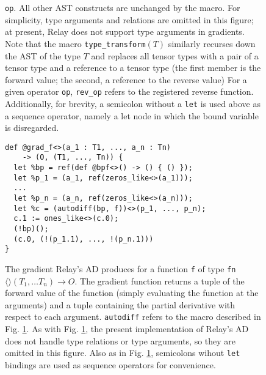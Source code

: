 \begin{figure}
{      \texttt{op}.
    All other AST constructs are unchanged by the macro.
    For simplicity, type arguments and relations
      are omitted in this figure;
      at present, Relay does not
      support type arguments in gradients.
    Note that the macro \texttt{type\_transform}$(T)$
      similarly recurses down the AST of the type $T$
      and replaces all tensor types with a
      pair of a tensor type
      and a reference to a tensor type
      (the first member is the forward value;
      the second, a reference to the reverse value)
    For a given operator \texttt{op},
      \texttt{rev\_op} refers to the registered reverse function.
    Additionally, for brevity,
      a semicolon without a \texttt{let}
      is used above as a sequence operator,
      namely a let node in which the bound
      variable is disregarded.}
  \label{fig:ad-expr-transform}
\end{figure}

\begin{figure}
  \begin{verbatim}
def @grad_f<>(a_1 : T1, ..., a_n : Tn)
    -> (O, (T1, ..., Tn)) {
  let %bp = ref(def @bpf<>() -> () { () });
  let %p_1 = (a_1, ref(zeros_like<>(a_1)));
  ...
  let %p_n = (a_n, ref(zeros_like<>(a_n)));
  let %c = (autodiff(bp, f))<>(p_1, ..., p_n);
  c.1 := ones_like<>(c.0);
  (!bp)();
  (c.0, (!(p_1.1), ..., !(p_n.1)))
}
  \end{verbatim}
  \caption{The gradient Relay{}'s AD produces
    for a function \texttt{f} of type
    \texttt{fn}$\langle\rangle(T_1, \ldots T_n) \rightarrow O$.
  The gradient function returns a tuple of
    the forward value of the function
    (simply evaluating the function at the arguments)
    and a tuple containing the
    partial derivative with respect to each argument.
  \texttt{autodiff} refers to the macro described in
    Fig. \ref{fig:ad-expr-transform}.
  As with Fig. \ref{fig:ad-expr-transform},
    the present implementation of
    Relay{}'s AD does not handle type relations or type arguments,
    so they are omitted in this figure.
  Also as in Fig. \ref{fig:ad-expr-transform},
    semicolons wihout \texttt{let} bindings
    are used as sequence operators for convenience.}
  \label{fig:ad-gradient}
\end{figure}
